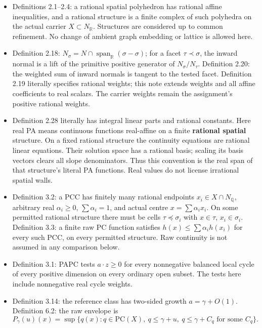 \documentclass[
  10pt,
]{article}
\providecommand{\tightlist}{%
  \setlength{\itemsep}{0pt}\setlength{\parskip}{0pt}}
\begin{document}
\begin{itemize}
\tightlist
\item
  Definitions 2.1--2.4: a rational spatial polyhedron has rational
  affine inequalities, and a rational structure is a finite complex of
  such polyhedra on the actual carrier \(X\subset N_{\mathbb{R}}\).
  Structures are considered up to common refinement. No change of
  ambient graph embedding or lattice is allowed here.
\item
  Definition 2.18:
  \(N_\sigma=N\cap\operatorname{span}_{\mathbb{R}}(\sigma-\sigma)\); for a
  facet \(\tau\prec\sigma\), the inward normal is a lift of the
  primitive positive generator of \(N_\sigma/N_\tau\). Definition 2.20:
  the weighted sum of inward normals is tangent to the tested facet.
  Definition 2.19 literally specifies rational weights; this note
  extends weights and all affine coefficients to real scalars. The
  carrier weights remain the assignment's positive rational weights.
\item
  Definition 2.28 literally has integral linear parts and rational
  constants. Here real PA means continuous functions real-affine on a
  finite \textbf{rational spatial} structure. On a fixed rational
  structure the continuity equations are rational linear equations.
  Their solution space has a rational basis; scaling its basis vectors
  clears all slope denominators. Thus this convention is the real span
  of that structure's literal PA functions. Real values do not license
  irrational spatial walls.
\item
  Definition 3.2: a PCC has finitely many rational endpoints
  \(x_i\in X\cap N_{\mathbb{Q}}\), arbitrary real \(\alpha_i\geq0\),
  \(\sum\alpha_i=1\), and actual centre \(x=\sum\alpha_i x_i\). On some
  permitted rational structure there must be cells
  \(\tau\preceq\sigma_i\) with \(x\in\tau\), \(x_i\in\sigma_i\).
  Definition 3.3: a finite raw PC function satisfies
  \(h(x)\leq\sum\alpha_i h(x_i)\) for every such PCC, on every permitted
  structure. Raw continuity is not assumed in any comparison below.
\item
  Definition 3.1: PAPC tests \(a\cdot z\geq0\) for every nonnegative
  balanced local cycle of every positive dimension on every ordinary
  open subset. The tests here include nonnegative real cycle weights.
\item
  Definition 3.14: the reference class has two-sided growth
  \(a=\gamma+O(1)\). Definition 6.2: the raw envelope is \[
   P_\gamma(u)(x)=\sup\{q(x):q\in\mathrm{PC}(X),\ q\leq\gamma+u,
                                  \ q\leq\gamma+C_q\text{ for some }C_q\}. \tag{3}
\]
\end{itemize}
\end{document}
